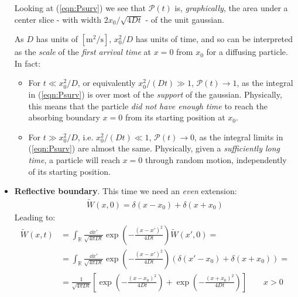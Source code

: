 \documentclass[../template.tex]{subfiles}
\begin{document}
\begin{exo}
\begin{itemize}
        Looking at (\ref{eqn:Psurv}) we see that $\mathcal{P}(t)$ is, \textit{graphically}, the area under a center slice - with width $2x_0/\sqrt{4 D t}$ - of the unit gaussian.
        
        As $D$ has units of $[\si{\m^2\per\s}]$, $x_0^2/D$ has units of time, and so can be interpreted as the \textit{scale} of the \textit{first arrival time} at $x=0$ from $x_0$ for a diffusing particle. In fact:
        \begin{itemize}
            \item For $t \ll x_0^2/D$, or equivalently $x_0^2/(Dt) \gg 1$, $\mathcal{P}(t) \to 1$, as the integral in (\ref{eqn:Psurv}) is over most of the \textit{support} of the gaussian. Physically, this means that the particle \textit{did not have enough time} to reach the absorbing boundary $x=0$ from its starting position at $x_0$.
            \item  For $t \gg x_0^2/D$, i.e. $x_0^2/(Dt) \ll 1$, $\mathcal{P}(t) \to 0$, as the integral limits in (\ref{eqn:Psurv}) are almost the same. Physically, given a \textit{sufficiently long time}, a particle will reach $x=0$ through random motion, independently of its starting position. 
        \end{itemize}
        

        
        
        
        \item \textbf{Reflective boundary}. This time we need an \textit{even} extension:
        \begin{align*}
            \tilde{W}(x,0) = \delta(x-x_0) + \delta(x+x_0)
        \end{align*}  
        Leading to:
        \begin{align*}
            \tilde{W}(x,t) &= \int_\mathbb{R} \frac{\dd{x'}}{\sqrt{4 \pi Dt}} \exp\left(-\frac{(x-x')^2}{4Dt} \right) \tilde{W}(x',0) =\\
            &= \int_{\mathbb{R}} \frac{\dd{x'}}{\sqrt{4 \pi D t}} \exp\left(-\frac{(x-x')^2}{4Dt} \right) (\delta(x'-x_0) + \delta(x+x_0)) =\\
            &=\frac{1}{\sqrt{4 \pi D t}} \left[\exp\left(-\frac{(x-x_0)^2}{4Dt} \right) + \exp\left(-\frac{(x+x_0)^2}{4Dt} \right)\right] \qquad x>0
        \end{align*}
    \end{itemize}
    
\end{exo}
\end{document}
